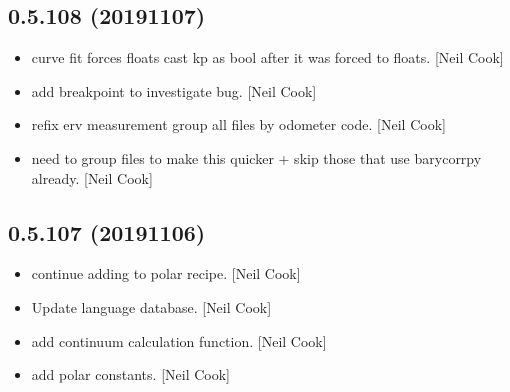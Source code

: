 \documentclass[a4paper,10pt,english]{report}
\begin{document}
\subsection{0.5.108 (2019\sphinxhyphen{}11\sphinxhyphen{}07)}
\label{\detokenize{misc/changelog:id54}}\begin{itemize}
\item {} 
 \sphinxhyphen{} curve fit forces floats \sphinxhyphen{} cast kp as
bool after it was forced to floats. {[}Neil Cook{]}

\item {} 
 \sphinxhyphen{} add breakpoint to investigate bug. {[}Neil
Cook{]}

\item {} 
 \sphinxhyphen{} re\sphinxhyphen{}fix erv measurement \sphinxhyphen{} group all
files by odometer code. {[}Neil Cook{]}

\item {} 
 \sphinxhyphen{} need to group files to make this
quicker + skip those that use barycorrpy already. {[}Neil Cook{]}

\end{itemize}


\subsection{0.5.107 (2019\sphinxhyphen{}11\sphinxhyphen{}06)}
\label{\detokenize{misc/changelog:id55}}\begin{itemize}
\item {} 
 \sphinxhyphen{} continue adding to polar recipe.
{[}Neil Cook{]}

\item {} 
Update language database. {[}Neil Cook{]}

\item {} 
 \sphinxhyphen{} add continuum calculation function. {[}Neil Cook{]}

\item {} 
 \sphinxhyphen{} add polar constants. {[}Neil
Cook{]}

\end{itemize}
\end{document}
